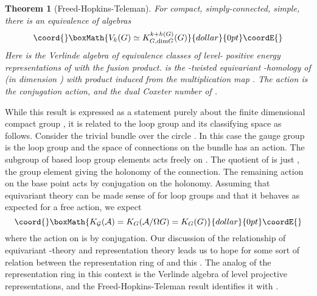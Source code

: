 \documentclass[a4paper,a4paper]{article}
\newtheorem{theorem}{Theorem}
\theoremstyle{conjecture}
\begin{document}
\begin{theorem}[Freed-Hopkins-Teleman]

For \coordHE{} compact, simply-connected, simple, there is an equivalence of algebras
$$\coord{}\boxMath{V_k(G)\simeq K_{G,\text {dim} G}^{k+h(G)}(G)}{dollar}{0pt}\coordE{}$$
Here \coordHE{} is the Verlinde algebra of equivalence classes of level-\coordHE{} positive energy representations of
\coordHE{} with the fusion product.  \coordHE{} is the
\coordHE{}-twisted equivariant \coordHE{}-homology of \coordHE{} (in dimension \coordHE{})  with product induced from the
multiplication map \coordHE{}.
The \coordHE{} action is the conjugation action, and \coordHE{} the dual Coxeter number of \coordHE{}.

\end{theorem}

While this result is expressed as a statement purely about the finite dimensional compact group \coordHE{}, it is related
to the loop group and its classifying space as follows.  Consider the trivial \coordHE{} bundle over the circle \coordHE{}. In this
case the gauge group \coordHE{}
is the loop group \coordHE{} and the space of connections \coordHE{} on the bundle has an \coordHE{} action.
The subgroup \coordHE{} of based loop group elements acts freely on \coordHE{}.  The quotient of \coordHE{} is
just \coordHE{}, the group element giving the holonomy of the connection.  The remaining \coordHE{} action on the base point acts by
conjugation on the holonomy.  Assuming that equivariant \coordHE{}theory can be made sense of for loop groups and that it
behaves as expected for a free action, we expect
$$\coord{}\boxMath{K_{\mathcal G}(\mathcal A)=K_G(\mathcal A/\Omega G)=K_G(G)}{dollar}{0pt}\coordE{}$$
where the \coordHE{} action on \coordHE{} is by conjugation.  Our discussion of
the relationship of equivariant \coordHE{}-theory and representation
theory leads us to hope for some sort of relation between the
representation ring of \coordHE{} and this \coordHE{}.  The analog of the
representation ring in this context is the Verlinde algebra
\coordHE{} of level \coordHE{} projective \coordHE{} representations, and the
Freed-Hopkins-Teleman result identifies it with \coordHE{}.
\end{document}
